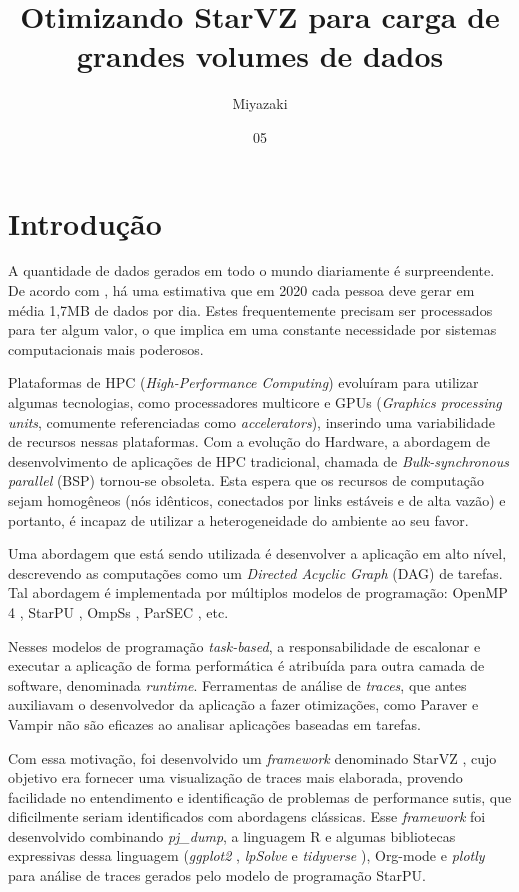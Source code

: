 \documentclass[prop-esp]{iiufrgs}
\title{Otimizando StarVZ para carga de grandes volumes de dados}
\author{Miyazaki}{Alexandre K. S.}
\date{05}{2019}
\begin{document}
\maketitle      



%
\chapter{Introdução} \label{intro}

A quantidade de dados gerados em todo o mundo diariamente é surpreendente. De acordo com \citet{ref:data_minute2}, há uma estimativa
que em 2020 cada pessoa deve gerar em média 1,7MB de dados por dia. Estes frequentemente precisam ser processados para ter algum valor,
o que implica em uma constante necessidade por sistemas computacionais mais poderosos.

Plataformas de HPC (\emph{High-Performance Computing}) evoluíram para utilizar algumas tecnologias, como processadores multicore e GPUs (\emph{Graphics processing units}, comumente referenciadas como \emph{accelerators}), inserindo uma variabilidade de recursos nessas plataformas. Com a evolução do Hardware, a abordagem de desenvolvimento de aplicações de HPC tradicional, chamada de \emph{Bulk-synchronous parallel} (BSP) tornou-se obsoleta. Esta espera que os recursos de computação sejam homogêneos (nós idênticos, conectados por links estáveis e de alta vazão) e portanto, é incapaz de utilizar a heterogeneidade do ambiente ao seu favor. 

Uma abordagem que está sendo utilizada é desenvolver a aplicação em alto nível, descrevendo as computações como um \emph{Directed Acyclic Graph} (DAG) de tarefas. Tal abordagem é implementada por múltiplos modelos de programação: OpenMP 4 \cite{ref:openmp4}, StarPU \cite{ref:starpu}, OmpSs \cite{ref:ompss}, ParSEC \cite{ref:parsec}, etc. 

Nesses modelos de programação \emph{task-based}, a responsabilidade de escalonar e executar a aplicação de forma performática é atribuída para outra camada de software, denominada \emph{runtime}. Ferramentas de análise de \emph{traces}, que antes auxiliavam o desenvolvedor da aplicação a fazer otimizações, como Paraver \cite{ref:paraver} e Vampir \cite{ref:vampir} não são eficazes ao analisar aplicações baseadas em tarefas.

Com essa motivação, foi desenvolvido um \emph{framework} denominado StarVZ \cite{ref:starvz}, cujo objetivo era fornecer uma visualização de traces mais elaborada, provendo facilidade no entendimento e identificação de problemas de performance sutis, que dificilmente seriam identificados com abordagens clássicas. Esse \emph{framework} foi desenvolvido combinando \emph{pj\_dump},  a linguagem R \cite{ref:rlanguage} e algumas bibliotecas expressivas dessa linguagem (\emph{ggplot2} \cite{ref:ggplot2}, \emph{lpSolve} \cite{ref:lpsolve} e \emph{tidyverse} \cite{ref:tidyverse}), Org-mode \cite{ref:org-mode} e \emph{plotly} para análise de traces gerados pelo modelo de programação StarPU.
\end{document}
